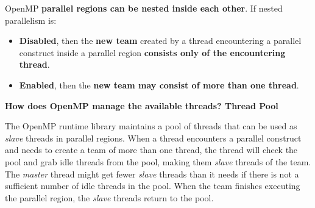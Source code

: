 \highspace
OpenMP \textbf{parallel regions can be nested inside each other}. If nested parallelism is:
\begin{itemize}
    \item \textbf{Disabled}, then the \textbf{new team} created by a thread encountering a parallel construct inside a parallel region \textbf{consists only of the encountering thread}.
    \item \textbf{Enabled}, then the \textbf{new team may consist of more than one thread}.
\end{itemize}

\newpage

\begin{flushleft}
    \textcolor{Green3}{ \textbf{How does OpenMP manage the available threads? Thread Pool}}
\end{flushleft}
The OpenMP runtime library maintains a pool of threads that can be used as \emph{slave} threads in parallel regions. When a thread encounters a parallel construct and needs to create a team of more than one thread, the thread will check the pool and grab idle threads from the pool, making them \emph{slave} threads of the team. The \emph{master} thread might get fewer \emph{slave} threads than it needs if there is not a sufficient number of idle threads in the pool. When the team finishes executing the parallel region, the \emph{slave} threads return to the pool.


